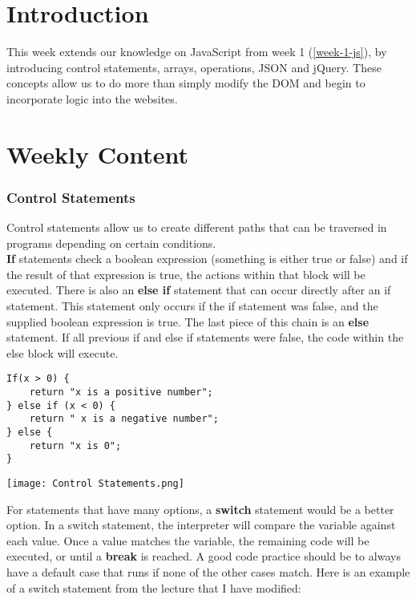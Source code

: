 \documentclass[portfolio.tex]{subfiles}
\begin{document}
		\label{week-3-js}
		\section{Introduction}
			This week extends our knowledge on JavaScript from week 1 (\ref{week-1-js}), by introducing control statements, arrays, operations, JSON and jQuery. These concepts allow us to do more than simply modify the DOM and begin to incorporate logic into the websites.

		\section{Weekly Content}
			\subsubsection{Control Statements}
				Control statements allow us to create different paths that can be traversed in programs depending on certain conditions. \\

				\textbf{If} statements check a boolean expression (something is either true or false) and if the result of that expression is true, the actions within that block will be executed. There is also an \textbf{else if} statement that can occur directly after an if statement. This statement only occurs if the if statement was false, and the supplied boolean expression is true. The last piece of this chain is an \textbf{else} statement. If all previous if and else if statements were false, the code within the else block will execute.  \\

				\begin{lstlisting}
If(x > 0) {
	return "x is a positive number";
} else if (x < 0) {
	return " x is a negative number";
} else {
	return "x is 0";
}
				\end{lstlisting}

				\vspace{0.5cm}

				\begin{center}
					\texttt{[image: Control Statements.png]}
				\end{center}


				For statements that have many options, a \textbf{switch} statement would be a better option. In a switch statement, the interpreter will compare the variable against each value. Once a value matches the variable, the remaining code will be executed, or until a \textbf{break} is reached. A good code practice should be to always have a default case that runs if none of the other cases match. Here is an example of a switch statement from the lecture that I have modified:\\
\end{document}
